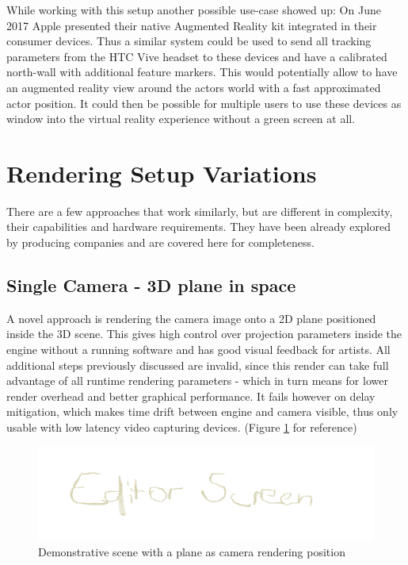 While working with this setup another possible use-case showed up: On June 2017 
Apple presented their native Augmented Reality kit integrated in their consumer 
devices. Thus a similar system could be used to send all tracking parameters 
from the HTC Vive headset to these devices and have a calibrated north-wall 
with additional feature markers. This would potentially allow to have an 
augmented reality view around the actors world with a fast approximated actor 
position. It could then be possible for multiple users to use these devices as 
window into the virtual reality experience without a green screen at all.

\section{Rendering Setup Variations}

There are a few approaches that work similarly, but are different in 
complexity, their capabilities and hardware requirements. They have been 
already explored by producing companies and are covered here for completeness.

\subsection{Single Camera - 3D plane in space}

A novel approach is rendering the camera image onto a 2D plane positioned 
inside the 3D scene. This gives high control over projection parameters inside 
the engine without a running software and has good visual feedback for artists. 
All additional steps previously discussed are invalid, since this render can 
take full advantage of all runtime rendering parameters - which in turn means 
for lower render overhead and better graphical performance. It fails however on 
delay mitigation, which makes time drift between engine and camera visible, 
thus only usable with low latency video capturing devices. (Figure 
\ref{fig:alt-render:single-camera} for reference)

\begin{figure}[htb]
	\includegraphics[width=\textwidth]{_raw_resources/editor_single_camera.png}
	\caption{Demonstrative scene with a plane as camera rendering position}
	\label{fig:alt-render:single-camera}
\end{figure}


